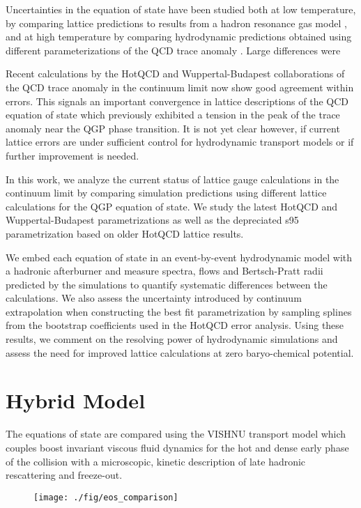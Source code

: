 \documentclass[aps,prc,reprint,amsmath,nofootinbib,superscriptaddress]{revtex4-1}
\begin{document}
Uncertainties in the equation of state have been studied both at low temperature, by comparing lattice predictions to results from a hadron resonance gas model
\cite{Huovinen:2009yb}, and at high temperature by comparing hydrodynamic predictions obtained using different parameterizations of the QCD trace anomaly 
\cite{Huovinen:2005gy, Huovinen:2009yb}. Large differences were 

Recent calculations by the HotQCD and Wuppertal-Budapest collaborations of the QCD trace anomaly in the continuum limit now show good agreement within errors. This 
signals an important convergence in lattice descriptions of the QCD equation of state which previously exhibited a tension in the peak of the trace anomaly near the 
QGP phase transition. It is not yet clear however, if current lattice errors are under sufficient control for hydrodynamic transport models or if further improvement 
is needed.  

In this work, we analyze the current status of lattice gauge calculations in the continuum limit by comparing simulation predictions using different lattice calculations 
for the QGP equation of state. We study the latest HotQCD and Wuppertal-Budapest parametrizations as well as the depreciated s95 parametrization based on older HotQCD 
lattice results. 

We embed each equation of state in an event-by-event hydrodynamic model with a hadronic afterburner and measure spectra, flows and Bertsch-Pratt radii predicted by the 
simulations to quantify systematic differences between the calculations. We also assess the uncertainty introduced by continuum extrapolation when constructing the best 
fit parametrization by sampling splines from the bootstrap coefficients used in the HotQCD error analysis. Using these results, we comment on the resolving power of 
hydrodynamic simulations and assess the need for improved lattice calculations at zero baryo-chemical potential.

\section{Hybrid Model}

The equations of state are compared using the VISHNU transport model which couples boost invariant viscous fluid dynamics for the hot and dense early phase of the collision 
with a microscopic, kinetic description of late hadronic rescattering and freeze-out. 

\begin{figure}
  \texttt{[image: ./fig/eos\_comparison]}
  \caption{
    \label{fig:spectra}
  }
\end{figure}
\end{document}
